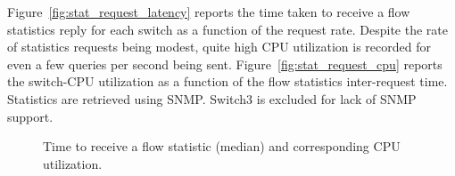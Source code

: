 Figure~\ref{fig:stat_request_latency} reports the time taken to receive a flow
statistics reply for each switch as a function of the request rate. Despite the
rate of statistics requests being modest, quite high CPU utilization is recorded
for even a few queries per second being sent. Figure~\ref{fig:stat_request_cpu}
reports the switch-CPU utilization as a function of the flow statistics
inter-request time. Statistics are retrieved using SNMP\@. Switch3 is excluded for
lack of SNMP support.

\begin{figure}[h]
  \begin{center}
  \end{center}
  \caption{Time to receive a flow statistic (median) and corresponding CPU utilization.}
  \label{fig:stat_request}
\end{figure}

